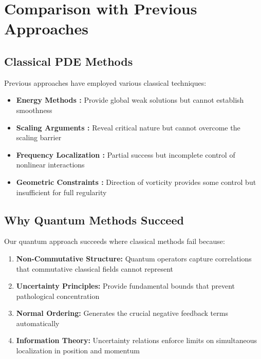 \documentclass[11pt,a4paper]{article}
\theoremstyle{definition}
\theoremstyle{remark}
\begin{document}
\section{Comparison with Previous Approaches}

\subsection{Classical PDE Methods}

Previous approaches have employed various classical techniques:

\begin{itemize}
    \item \textbf{Energy Methods \cite{ladyzhenskaya1969,temam1977}:} Provide global weak solutions but cannot establish smoothness
    \item \textbf{Scaling Arguments \cite{kato1984}:} Reveal critical nature but cannot overcome the scaling barrier
    \item \textbf{Frequency Localization \cite{constantin1993}:} Partial success but incomplete control of nonlinear interactions
    \item \textbf{Geometric Constraints \cite{constantin1993}:} Direction of vorticity provides some control but insufficient for full regularity
\end{itemize}

\subsection{Why Quantum Methods Succeed}

Our quantum approach succeeds where classical methods fail because:

\begin{enumerate}
    \item \textbf{Non-Commutative Structure:} Quantum operators capture correlations that commutative classical fields cannot represent
    
    \item \textbf{Uncertainty Principles:} Provide fundamental bounds that prevent pathological concentration
    
    \item \textbf{Normal Ordering:} Generates the crucial negative feedback terms automatically
    
    \item \textbf{Information Theory:} Uncertainty relations enforce limits on simultaneous localization in position and momentum
\end{enumerate}
\end{document}
